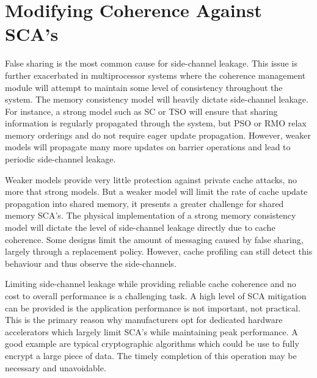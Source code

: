 \section{Modifying Coherence Against SCA's}
	False sharing is the most common cause for side-channel leakage. This issue is further exacerbated in multiprocessor systems where the coherence management module will attempt to maintain some level of consistency throughout the system. The memory consistency model will heavily dictate side-channel leakage. For instance, a strong model such as SC or TSO will ensure that sharing information is regularly propagated through the system, but PSO or RMO relax memory orderings and do not require eager update propagation. However, weaker models will propagate many more updates on barrier operations and lead to periodic side-channel leakage. 
	
	Weaker models provide very little protection against private cache attacks, no more that strong models. But a weaker model will limit the rate of cache update propagation into shared memory, it presents a greater challenge for shared memory SCA's. The physical implementation of a strong memory consistency model will dictate the level of side-channel leakage directly due to cache coherence. Some designs limit the amount of messaging caused by false sharing, largely through a replacement policy. However, cache profiling can still detect this behaviour and thus observe the side-channels.
	
	Limiting side-channel leakage while providing reliable cache coherence and no cost to overall performance is a challenging task. A high level of SCA mitigation can be provided is the application performance is not important, not practical. This is the primary reason why manufacturers opt for dedicated hardware accelerators which largely limit SCA's while maintaining peak performance. A good example are typical cryptographic algorithms which could be use to fully encrypt a large piece of data. The timely completion of this operation may be necessary and unavoidable.
	
